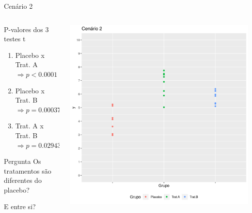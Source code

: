 \documentclass{beamer}
\begin{document}
\begin{frame}[label=cenario2-prob]{\scriptsize Cenário 2}
  \begin{columns}
    \begin{column}{5cm}
      \begin{exampleblock}{\footnotesize P-valores dos 3 testes t}
        \begin{enumerate}
          \tiny
        \item Placebo x Trat. A $\Rightarrow p< 0.0001$
        \item Placebo x Trat. B $\Rightarrow p=0.00037$
        \item Trat. A x Trat. B $\Rightarrow p=0.02943$
        \end{enumerate}
      \end{exampleblock}
      \bigskip
      \bigskip
      \begin{exampleblock}{\footnotesize Pergunta}
        \footnotesize
        Os tratamentos são diferentes do placebo?

        \bigskip
        E entre si?
      \end{exampleblock}
    \end{column}
    \begin{column}{5cm}
      \includegraphics[width=\textwidth]{Cap13-30/cenario21}
    \end{column}
  \end{columns}
\end{frame}
\end{document}
